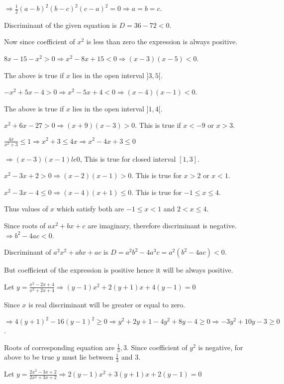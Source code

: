   $\Rightarrow \frac{1}{2}(a - b)^2(b - c)^2(c - a)^2 = 0\Rightarrow a = b = c$.
\item Discriminant of the given equation is $D = 36 - 72 < 0$.

  Now since coefficient of $x^2$ is less than zero the expression is always positive.
\item $8x - 15 - x^2 > 0\Rightarrow x^2 - 8x + 15 < 0 \Rightarrow (x - 3)(x - 5) < 0$.

  The above is true if $x$ lies in the open interval $]3, 5[$.
\item $-x^2 + 5x - 4 > 0\Rightarrow x^2 - 5x + 4 < 0\Rightarrow (x - 4)(x - 1) < 0$.

  The above is true if $x$ lies in the open interval $]1, 4[$.
\item $x^2 + 6x - 27 > 0\Rightarrow (x + 9)(x - 3) > 0$. This is true if $x < -9$ or $x > 3$.
\item $\frac{4x}{x^2 + 3} \le 1 \Rightarrow x^2 + 3 \le 4x\Rightarrow x^2 - 4x + 3 \le 0$

  $\Rightarrow (x - 3)(x - 1) le 0$, This is true for closed interval $[1, 3]$.
\item $x^2 - 3x + 2 > 0\Rightarrow (x - 2)(x - 1) > 0$. This is true for $x > 2$ or $x < 1$.

  $x^2 - 3x - 4 \le 0\Rightarrow (x - 4)(x + 1) \le 0$. This is true for $-1 \le x \le 4$.

  Thus values of $x$ which satisfy both are $-1 \le x < 1$ and $2 < x \le 4$.
\item Since roots of $ax^2 + bx + c$ are imaginary, therefore discriminant is negative. $\Rightarrow b^2 -
  4ac < 0$.

  Discriminant of $a^2x^2 + abx + ac$ is $D = a^2b^2 - 4a^3c = a^2(b^2 - 4ac) < 0$.

  But coefficient of the expression is positive hence it will be always positive.
\item Let $y = \frac{x^2 - 2x + 4}{x^2 + 2x + 4}\Rightarrow (y - 1)x^2 + 2(y + 1)x + 4(y - 1) = 0$

  Since $x$ is real discriminant will be greater or equal to zero.

  $\Rightarrow 4(y + 1)^2 - 16(y - 1)^2 \ge 0\Rightarrow y^2 + 2y + 1 - 4y^2 + 8y - 4 \ge 0\Rightarrow -3y^2
  + 10y - 3 \ge 0$.

  Roots of corresponding equation are $\frac{1}{3}, 3$. Since coefficient of $y^2$ is negative, for above to be true
  $y$ must lie between $\frac{1}{3}$ and $3$.
\item Let $y = \frac{2x^2 - 3x + 2}{2x^2 + 3x + 2}\Rightarrow 2(y - 1)x^2 + 3(y + 1)x + 2(y - 1) = 0$


